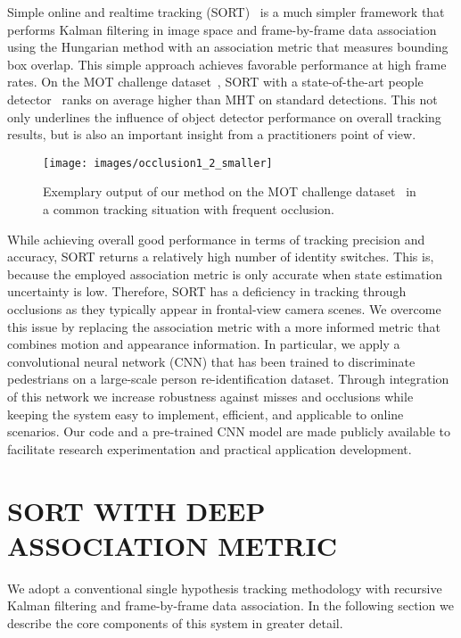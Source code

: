 \documentclass{article}
\begin{document}
Simple online and realtime tracking (SORT)~\cite{Bewley2016_sort} is a much
simpler framework that performs Kalman filtering in image space and
frame-by-frame data association using the Hungarian method
with an association metric that measures bounding box overlap.
This simple approach achieves favorable performance at high frame rates.
On the MOT challenge dataset~\cite{MOTChallenge2015},
SORT with a state-of-the-art people detector~\cite{renNIPS15fasterrcnn}
ranks on average higher than MHT on standard detections.
This not only underlines the influence of object detector performance on
overall tracking results, but is also an important insight from a practitioners
point of view.

\begin{figure}[t!]
\centering
\texttt{[image: images/occlusion1\_2\_smaller]}
\caption{Exemplary output of our method on the MOT challenge
    dataset~\cite{milan2016mot16} in a common tracking situation with
    frequent occlusion.}
\label{fig:example-output}
\vspace{-0.4cm}
\end{figure}

While achieving overall good performance in terms of tracking precision and
accuracy, SORT returns a relatively high number of identity switches.
This is, because the employed association metric is only accurate when state estimation uncertainty is low.
Therefore, SORT has a deficiency in tracking through occlusions as they
typically appear in frontal-view camera scenes.
We overcome this issue by replacing the association metric with
a more informed metric that combines motion and appearance information.
In particular, we apply a convolutional neural network (CNN) that has been
trained to discriminate pedestrians on a large-scale person re-identification
dataset.
Through integration of this network we increase robustness against misses
and occlusions while keeping the system easy to implement, efficient, and
applicable to online scenarios.
Our code and a pre-trained CNN model are made publicly available to
facilitate research experimentation and practical application development.



\section{SORT WITH DEEP ASSOCIATION METRIC}
\label{sec:tracking}

We adopt a conventional single hypothesis tracking methodology with recursive
Kalman filtering and frame-by-frame data association.
In the following section we describe the core components of this system in
greater detail.
\end{document}
